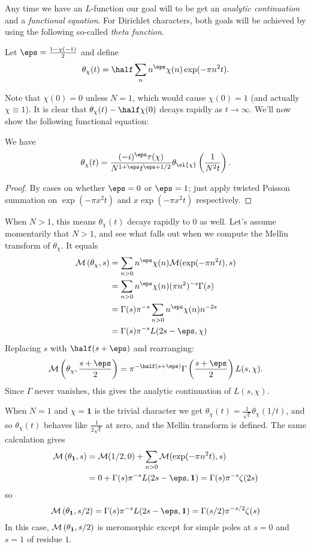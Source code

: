 Any time we have an $L$-function
our goal will to be get an \emph{analytic continuation}
and a \emph{functional equation}.
For Dirichlet characters, both goals will be achieved
by using the following so-called \emph{theta function}.
\begin{definition}
  Let $\eps = \frac{1-\chi(-1)}{2}$ and define
  \[ \theta_\chi(t)
  = \half \sum_n n^\eps \chi(n) \exp(-\pi n^2 t). \]
\end{definition}
Note that $\chi(0) = 0$ unless $N = 1$,
which would cause $\chi(0) = 1$
(and actually $\chi \equiv 1$).
It is clear that $\theta_\chi(t) - \half \chi(0)$
decays rapidly as $t \to \infty$.
We'll now show the following functional equation:
\begin{proposition}
  We have
  \[ \theta_\chi(t) = \frac{(-i)^\eps \tau(\chi)}
    {N^{1+\eps} t^{\eps+1/2}}
    \theta_{\ol{\chi}} \left( \frac{1}{N^2 t} \right). \]
\end{proposition}
\begin{proof}
  By cases on whether $\eps = 0$ or $\eps = 1$;
  just apply twisted Poisson summation
  on $\exp(-\pi x^2t)$ and $x\exp(-\pi x^2t)$ respectively.
\end{proof}
When $N > 1$, this means $\theta_\chi(t)$
decays rapidly to $0$ as well.
Let's assume momentarily that $N > 1$,
and see what falls out when we compute the
Mellin transform of $\theta_\chi$.
It equals
\begin{align*}
  \MM\left(\theta_\chi, s\right)
  &= \sum_{n>0} n^\eps \chi(n)
    \MM(\exp(-\pi n^2t), s) \\
  &= \sum_{n>0} n^\eps \chi(n) (\pi n^2)^{-s} \Gamma(s) \\
  &= \Gamma(s) \pi^{-s} \sum_{n>0} n^\eps \chi(n) n^{-2s} \\
  &= \Gamma(s) \pi^{-s} L(2s-\eps, \chi)
\end{align*}
Replacing $s$ with $\half(s+\eps)$ and rearranging:
\[ \MM\left(\theta_\chi, \frac{s+\eps}{2} \right)
  = \pi^{-\half(s+\eps)}
  \Gamma\left( \frac{s+\eps}{2} \right) L(s, \chi).  \]
Since $\Gamma$ never vanishes,
this gives the analytic continuation of $L(s, \chi)$.

When $N = 1$ and $\chi = \mathbf 1$
is the trivial character we get
$\theta_\chi(t) = \frac{1}{\sqrt t} \theta_{\chi}(1/t)$,
and so $\theta_\chi(t)$ behaves like $\frac{1}{2\sqrt t}$ at zero,
and the Mellin transform is defined.
The same calculation gives
\begin{align*}
  \MM\left(\theta_{\mathbf 1}, s\right)
  &= \MM(1/2, 0) + \sum_{n>0} \MM(\exp(-\pi n^2t), s) \\
  &= 0 + \Gamma(s) \pi^{-s} L(2s-\eps, \mathbf 1)
  = \Gamma(s) \pi^{-s} \zeta(2s)
\end{align*}
so
\[ \MM\left(\theta_{\mathbf 1}, s/2 \right)
  = \Gamma(s) \pi^{-s} L(2s-\eps, \mathbf 1)
  = \Gamma(s/2) \pi^{-s/2} \zeta(s) \]
In this case, $\mathcal M\left(\theta_{\mathbf 1}, s/2 \right)$
is meromorphic except for simple poles at $s=0$ and $s=1$
of residue $1$.

